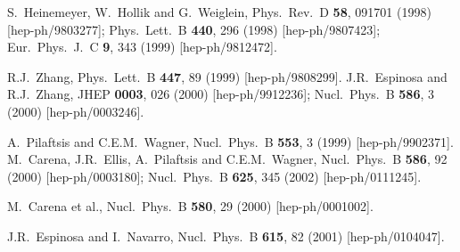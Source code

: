 \documentclass[12pt]{article}
\begin{document}
\begin{thebibliography}{999}
S.~Heinemeyer, W.~Hollik and G.~Weiglein,
  Phys.\ Rev.\ D {\bf 58}, 091701 (1998)
  [hep-ph/9803277];
  Phys.\ Lett.\ B {\bf 440}, 296 (1998)
  [hep-ph/9807423];
  Eur.\ Phys.\ J.\ C {\bf 9}, 343 (1999)
  [hep-ph/9812472].

R.J.~Zhang,
  Phys.\ Lett.\ B {\bf 447}, 89 (1999)
  [hep-ph/9808299].
J.R.~Espinosa and R.J.~Zhang,
  JHEP {\bf 0003}, 026 (2000)
  [hep-ph/9912236];
  Nucl.\ Phys.\ B {\bf 586}, 3 (2000)
  [hep-ph/0003246].

A.~Pilaftsis and C.E.M.~Wagner,
  Nucl.\ Phys.\ B {\bf 553}, 3 (1999)
  [hep-ph/9902371].
M.~Carena, J.R.~Ellis, A.~Pilaftsis and C.E.M.~Wagner,
  Nucl.\ Phys.\ B {\bf 586}, 92 (2000)
  [hep-ph/0003180];
  Nucl.\ Phys.\ B {\bf 625}, 345 (2002)
  [hep-ph/0111245].

M.~Carena et al.,
  Nucl.\ Phys.\ B {\bf 580}, 29 (2000)
  [hep-ph/0001002].

J.R.~Espinosa and I.~Navarro,
  Nucl.\ Phys.\ B {\bf 615}, 82 (2001)
  [hep-ph/0104047].


\end{thebibliography}
\end{document}
